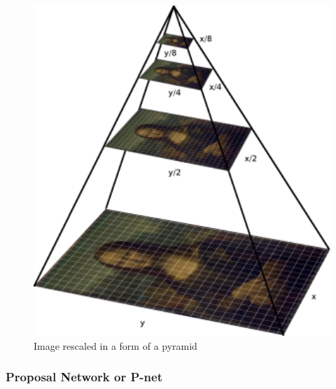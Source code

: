 \begin{figure}[!htb]
    \centering
    \includegraphics[width=1\textwidth]{figures/pyramid.png}
    \caption{ Image rescaled in a form of a pyramid}
    \label{fig:pyramid}
\end{figure}

\subsubsection{Proposal Network or P-net}

